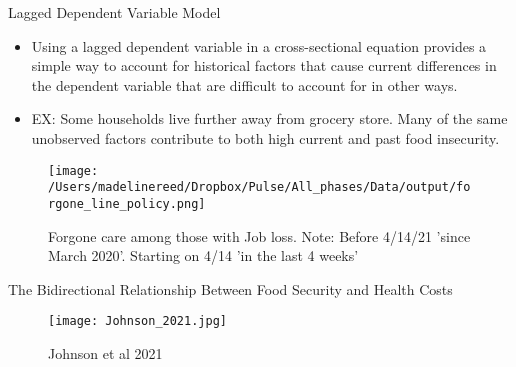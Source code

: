 \documentclass[t, hyperref={colorlinks=true}, compress]{beamer}
\begin{document}
\begin{frame}{Lagged Dependent Variable Model}
\begin{itemize}
\item Using a lagged dependent variable in a cross-sectional equation provides a simple way to account for historical factors that cause current differences in the dependent variable that are difficult to account for in other ways.
\bigskip
\item EX: Some households live further away from grocery store. Many of the same unobserved factors contribute to both high current and past food insecurity.
\end{itemize}
\end{frame}







\begin{frame}
\begin{figure}
    \centering 
\texttt{[image: /Users/madelinereed/Dropbox/Pulse/All\_phases/Data/output/forgone\_line\_policy.png]}
\footnotesize  
    \caption{Forgone care among those with Job loss. Note: Before 4/14/21  'since March 2020'. Starting on 4/14  'in the last 4 weeks'}
\end{figure}
\end{frame}


\begin{frame}{The Bidirectional Relationship Between Food Security and Health Costs}
\begin{figure}
\texttt{[image: Johnson\_2021.jpg]}
    \caption{Johnson et al 2021}
\end{figure}

\end{frame}
\end{document}
